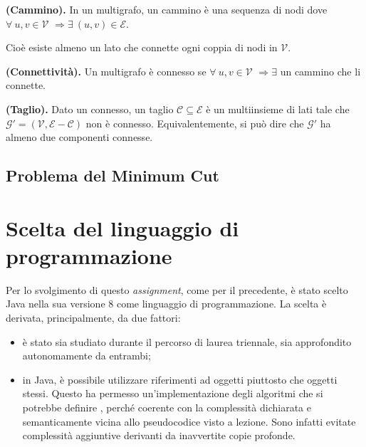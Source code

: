 \begin{defi} \textbf{(Cammino).} In un multigrafo, un cammino è una sequenza di nodi dove $\forall\ u,v\in\mathcal{V}$ $\Rightarrow\exists\ (u,v)\in\mathcal{E} $.
\end{defi}
Cioè esiste almeno un lato che connette ogni coppia di nodi in $\mathcal{V}$.
\begin{defi} \textbf{(Connettività).} Un multigrafo è connesso se $\forall\ u,v\in\mathcal{V}$ $\Rightarrow\exists$ un cammino che li connette.
\end{defi}
\begin{defi} \textbf{(Taglio).} Dato un \mgrafo connesso, un taglio $\mathcal{C}\subseteq\mathcal{E}$ è un multiinsieme di lati tale che $\mathcal{G}' = (\mathcal{V}, \mathcal{E} - \mathcal{C})$ non è connesso.\eqcapo
Equivalentemente, si può dire che $\mathcal{G}'$ ha almeno due componenti connesse.
\end{defi}
\newpage
\subsection{Problema del Minimum Cut}
\emph{}
	
 
\section{Scelta del linguaggio di programmazione}
Per lo svolgimento di questo \emph{assignment}, come per il precedente, è stato scelto Java nella sua versione 8 come linguaggio di programmazione. La scelta è derivata, principalmente, da due fattori: 
\begin{itemize}
	\item è stato sia studiato durante il percorso di laurea triennale, sia approfondito autonomamente da entrambi;
	\item in Java, è possibile utilizzare riferimenti ad oggetti piuttosto che oggetti stessi. Questo ha permesso un'implementazione degli algoritmi che si potrebbe definire , perché coerente con la complessità dichiarata e semanticamente vicina allo pseudocodice visto a lezione. Sono infatti evitate complessità aggiuntive derivanti da inavvertite copie profonde.
\end{itemize}

